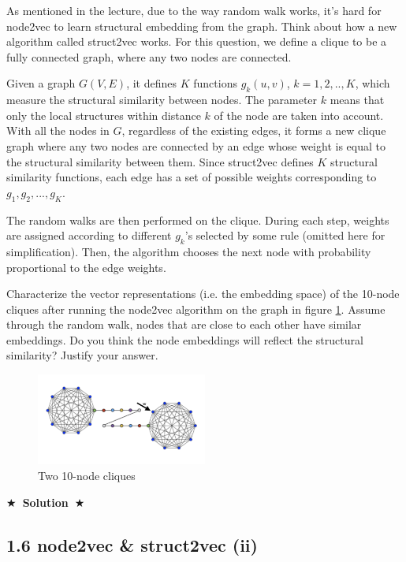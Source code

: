 \documentclass{article}
\newcommand{\Solution}[1]{{\medskip \color{red} \bf $\bigstar$~\sf \textbf{Solution}~$\bigstar$ \sf #1 } \bigskip}
\begin{document}
{{{As mentioned in the lecture, due to the way random walk works, it’s hard for node2vec to learn structural embedding from the graph. Think about how a new algorithm called struct2vec works. For this question, we define a clique to be a fully connected graph, where any two nodes are connected.

Given a graph $G(V,E)$, it defines $K$ functions $g_k(u, v)$, $k = 1, 2, .., K$, which measure the structural similarity between nodes. The parameter $k$ means that only the local structures within distance $k$ of the node are taken into account. With all the nodes in $G$, regardless of the existing edges, it forms a new clique graph where any two nodes are connected by an edge whose weight is equal to the structural similarity between them. Since struct2vec defines $K$ structural similarity functions, each edge has a set of possible weights corresponding to $g_1, g_2, ..., g_K$.

The random walks are then performed on the clique. During each step, weights are assigned according to different $g_k$’s selected by some rule (omitted here for simplification). Then, the algorithm chooses the next node with probability proportional to the edge weights.

Characterize the vector representations (i.e. the embedding space) of the 10-node cliques after running the node2vec algorithm on the graph in figure \ref{fig:10-node-cliques}. Assume through the random walk, nodes that are close to each other have similar embeddings. Do you think the node embeddings will reflect the structural similarity? Justify your answer.

\begin{figure}[h]
\centering
\includegraphics[width=0.5\textwidth]{10_node_cliques.png}
\caption{Two 10-node cliques}
\label{fig:10-node-cliques}
\end{figure}


\Solution{}

\subsection*{1.6 node2vec \& struct2vec (ii)}

}}}
\end{document}
